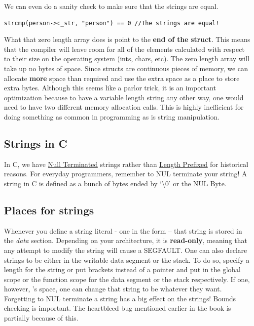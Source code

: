 We can even do a sanity check to make sure that the strings are equal.

\begin{verbatim}
strcmp(person->c_str, "person") == 0 //The strings are equal!
\end{verbatim}

What that zero length array does is point to the \textbf{end of the struct}. This means that the compiler will leave room for all of the elements calculated with respect to their size on the operating system (ints, chars, etc).
The zero length array will take up no bytes of space.
Since structs are continuous pieces of memory, we can allocate \textbf{more} space than required and use the extra space as a place to store extra bytes.
Although this seems like a parlor trick, it is an important optimization because to have a variable length string any other way, one would need to have two different memory allocation calls.
This is highly inefficient for doing something as common in programming as is string manipulation.

\subsection{Strings in C}

In C, we have
\href{https://en.wikipedia.org/wiki/Null-terminated_string}{Null
	Terminated} strings rather than
\href{https://en.wikipedia.org/wiki/String_(computer_science)\#Length-prefixed}{Length
	Prefixed} for historical reasons.
For everyday programmers, remember to NUL terminate your string!
A string in C is defined as a bunch of bytes ended by `\textbackslash 0' or the NUL Byte.

\subsection{Places for strings}

Whenever you define a string literal - one in the form  -- that string is stored in the \emph{data} section. Depending on your architecture, it is \textbf{read-only}, meaning that any attempt to modify the string will cause a SEGFAULT.
One can also declare strings to be either in the writable data segment or the stack. To do so, specify a length for the string or put brackets instead of a pointer  and put in the global scope or the function scope for the data segment or the stack respectively.
If one, however, 's space, one can change that string to be whatever they want.
Forgetting to NUL terminate a string has a big effect on the strings! Bounds checking is important.
The heartbleed bug mentioned earlier in the book is partially because of this.

